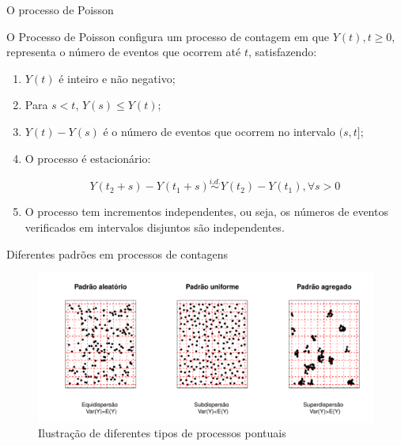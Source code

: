 \documentclass[10pt, aspectratio=169]{beamer}
\begin{document}



\begin{frame}{O processo de Poisson}
    
    O Processo de Poisson configura um processo de contagem em que $Y(t),t\geqslant 0$, representa o número de eventos que ocorrem até $t$, satisfazendo:
    
    \vspace{0,5cm}
    
    \begin{enumerate}
        \item $Y(t)$ é inteiro e não negativo;
        \item Para $s<t$, $Y(s)\leq Y(t)$;
        \item $Y(t)-Y(s)$ é o número de eventos que ocorrem no intervalo $(s,t]$;
        \item O processo é estacionário:
        
        $$
            Y(t_{2}+s)-Y(t_{1}+s) \overset{i.d. }{\sim}Y(t_{2})-Y(t_{1}), \forall s>0
       $$
        
        \item O processo tem incrementos independentes, ou seja, os números de eventos verificados em intervalos disjuntos são independentes.
    \end{enumerate}

\end{frame}




\begin{frame}{Diferentes padrões em processos de contagens}
    
\begin{figure}[h]
    \includegraphics[scale=0.6]{images/processos14.pdf}
    \caption{Ilustração de diferentes tipos de processos pontuais}
    \label{Fig2}
    \centering
    
\end{figure}
\end{frame}
\end{document}
